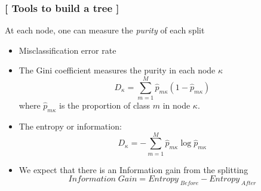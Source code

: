 \documentclass[xcolor=x11names,compress, handhouts]{beamer}
\renewcommand{\(}{\begin{columns}}
\renewcommand{\)}{\end{columns}}
\newcommand{\<}[1]{\begin{column}{#1}}
\renewcommand{\>}{\end{column}}
\begin{document}
\begin{frame}
\frametitle{\textcolor{brique}{[ Tools to build a tree ]}}
At each node, one can measure the \textit{purity} of each split
\pause
\begin{itemize}[<+->]
    \item  Misclassification error rate
    \item  The Gini coefficient measures the purity in each node $\kappa$
$$
  D_{\kappa} = \sum_{m=1}^M  \widehat{p}_{m \kappa} (1-\widehat{p}_{m
  \kappa})
$$
  where $\widehat{p}_{m \kappa}$ is the proportion of class $m$ in
  node $\kappa$.
    \item  The entropy or information:
 $$
  D_{\kappa} =   - \sum_{m=1}^M  \widehat{p}_{m \kappa}  \log
  \widehat{p}_{m \kappa}
  $$
  \item We expect that there is an Information gain from the splitting
  $$Information\;Gain = Entropy_{\; Before} - Entropy_{\; After}$$

\end{itemize}
\end{frame}
\end{document}
